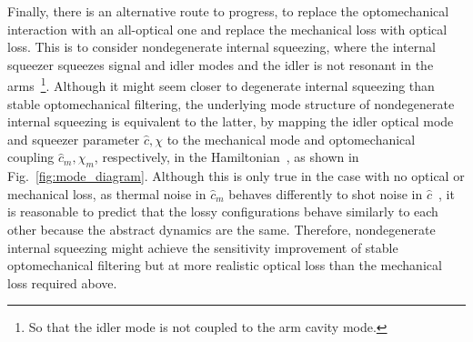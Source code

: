 Finally, there is an alternative route to progress, to replace the optomechanical interaction with an all-optical one and replace the mechanical loss with optical loss. This is to consider nondegenerate internal squeezing, where the internal squeezer squeezes signal and idler modes and the idler is not resonant in the arms~\footnote{So that the idler mode is not coupled to the arm cavity mode.}. 
Although it might seem closer to degenerate internal squeezing than stable optomechanical filtering, the underlying mode structure of nondegenerate internal squeezing is equivalent to the latter, by mapping the idler optical mode and squeezer parameter $\hat c, \chi$ to the mechanical mode and optomechanical coupling $\hat{c}_m, \chi_m$, respectively, in the Hamiltonian~\cite{}, as shown in Fig.~\ref{fig:mode_diagram}. Although this is only true in the case with no optical or mechanical loss, as thermal noise in $\hat{c}_m$ behaves differently to shot noise in $\hat c$~\cite{}, it is reasonable to predict that the lossy configurations behave similarly to each other because the abstract dynamics are the same. Therefore, nondegenerate internal squeezing might achieve the sensitivity improvement of stable optomechanical filtering but at more realistic optical loss than the mechanical loss required above.



